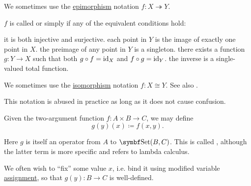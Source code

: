 \begin{definition}
\begin{defenum}
    We sometimes use the \hyperref[def:morphism_invertibility/epimorphism]{epimorphism} notation \( f: X \twoheadrightarrow Y \).

     \( f \) is called  or simply  if any of the equivalent conditions hold:
    \begin{defenum}
       it is both injective and surjective.
       each point in \( Y \) is the image of exactly one point in \( X \).
       the preimage of any point in \( Y \) is a singleton.
       there exists a function \( g: Y \to X \) such that both \( g \circ f = \operatorname{id}_X \) and \( f \circ g = \operatorname{id}_Y \).
       the inverse is a single-valued total function.
    \end{defenum}

    We sometimes use the \hyperref[def:morphism_invertibility/isomorphism]{isomorphism} notation \( f: X \cong Y \). See also .
  \end{defenum}
\end{definition}

\begin{definition}\label{def:currying}
  This notation is abused in practice as long as it does not cause confusion.

  Given the two-argument function \( f: A \times B \to C \), we may define
  \begin{equation*}
    g(y)(x) \coloneqq f(x, y).
  \end{equation*}

  Here \( g \) is itself an operator from \( A \) to \( \Cat{Set}(B, C) \). This is called , although the latter term is more specific and refers to lambda calculus.

  We often wish to \enquote{fix} some value \( x \), i.e. bind it using modified variable \hyperref[def:first_order_variable_assignment]{assignment}, so that \( g(y): B \to C \) is well-defined.
\end{definition}


